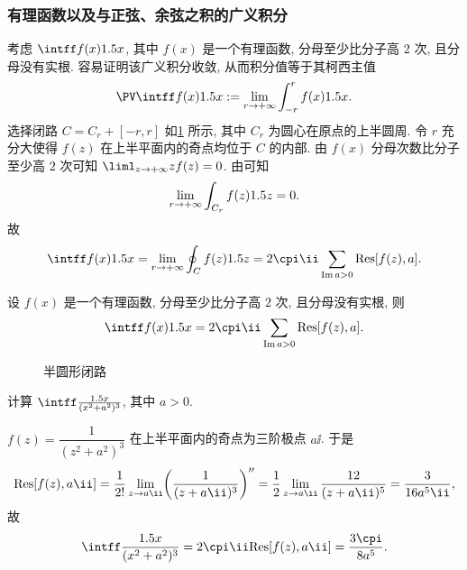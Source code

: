 \subsubsection{有理函数以及与正弦、余弦之积的广义积分}

考虑 $\intff f(x)\d x$, 其中 $f(x)$ 是一个有理函数, 分母至少比分子高 $2$ 次, 且分母没有实根.
容易证明该广义积分收敛, 从而积分值等于其柯西主值
\[
  \PV \intff f(x)\d x:=\lim_{r\ra+\infty}\int_{-r}^rf(x)\d x.
\]
选择闭路 $C=C_r+[-r,r]$ 如\ref{fig:half-circle-contour} 所示, 其中 $C_r$ 为圆心在原点的上半圆周.
令 $r$ 充分大使得 $f(z)$ 在上半平面内的奇点均位于 $C$ 的内部.
由 $f(x)$ 分母次数比分子至少高 $2$ 次可知 $\liml_{z\ra+\infty} zf(z)=0$.
由\thmSA 可知
\[
  \lim_{r\rightarrow +\infty}\int_{C_r}f(z)1.5 z=0.
\]
故
\[
   \intff f(x)\d x
  =\lim_{r\ra +\infty}\oint_Cf(z)\d z
  =2\cpi\ii\sum_{\Im a>0}\Res[f(z),a].
\]

\begin{theorem}
  设 $f(x)$ 是一个有理函数, 分母至少比分子高 $2$ 次, 且分母没有实根, 则
  \[
     \intff f(x)\d x
    =2\cpi\ii\sum_{\Im a>0}\Res[f(z),a].
  \]
\end{theorem}

\begin{figure}[!htb]
  \centering
  \caption{半圆形闭路}
  \label{fig:half-circle-contour}
\end{figure}

\begin{example}
  计算 $\intff \frac{\d x}{(x^2+a^2)^3}$, 其中 $a>0$.
\end{example}

\begin{solution}
  $f(z)=\dfrac1{(z^2+a^2)^3}$ 在上半平面内的奇点为三阶极点 $a\ii$.
  于是
  \[
     \Res[f(z),a\ii]
    =\frac1{2!}\lim_{z\ra a\ii}\biggl(\frac1{(z+a\ii)^3}\biggr)''
    =\half\lim_{z\ra a\ii}\frac{12}{(z+a\ii)^5}
    =\frac{3}{16a^5\ii},
  \]
  故
  \[
     \intff \frac{\d x}{(x^2+a^2)^3}
    =2\cpi\ii\Res[f(z),a\ii]
    =\frac{3\cpi}{8a^5}.
  \]
\end{solution}

